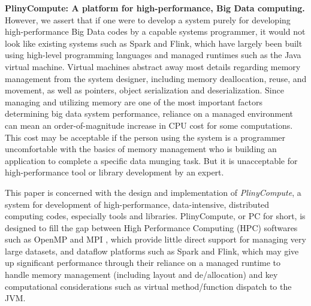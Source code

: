 \vspace{5 pt}
\noindent
\textbf{PlinyCompute: A platform for high-performance, Big Data computing.}
However, we assert that if one were to develop a system purely for developing high-performance
Big Data codes
by a capable systems programmer,
it would not look like existing systems such as Spark and Flink,
which have largely 
been built using high-level programming languages and managed runtimes such as the Java 
virtual machine.  Virtual machines abstract away
most details regarding memory management
from the system designer, including memory deallocation, reuse, and movement, as well as pointers,
object serialization and deserialization.
Since managing and utilizing memory are 
one of the most important factors determining big data system performance, reliance
on a managed environment can mean an order-of-magnitude increase in CPU cost for some computations.  
This cost may be acceptable if the person using the system
is a programmer uncomfortable with the basics of memory management who is
building an application to complete a specific data munging task.  
But it is unacceptable for high-performance tool or library development by an expert.

This paper is concerned with the design and implementation of
\emph{PlinyCompute}, a system for development of
high-performance, data-intensive, distributed computing codes, especially tools and libraries.
PlinyCompute, or PC for short, is designed to fill the gap between
High Performance Computing (HPC) softwares such as OpenMP \cite{dagum1998openmp} and MPI \cite{gropp1996high}, which provide little direct support for
managing very large datasets, and dataflow platforms such as Spark and Flink, which 
may give up significant performance through their reliance on a managed runtime to handle
memory management (including layout and de/allocation) and key computational considerations
such as virtual method/function dispatch to the JVM. 

